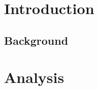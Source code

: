 \documentclass[11pt]{article}                             %
\newenvironment{colfigure}{                               %
  {\noindent\minipage{\linewidth}}                        %
  {\endminipage\par\bigskip}                              %
}
\newcommand{\colgraphic}[2]{%
  \begin{colfigure}                                       %
    \centering                                            %
    \texttt{[image: \#1]}            %
    \captionof{figure}{#2}                                %
  \end{colfigure}
}
\begin{document}

\medskip                                                  %
\noindent\makebox[\linewidth]{                            %
  \rule{\textwidth}{0.2pt}
}

\begin{multicols}{2}                                      %
  \section{Introduction}                                  %

  \subsection{Background}                                 %
  \blindtext

  \section{Analysis}
  \blindtext

  \bigskip                                                %

  \noindent\blindtext                                     %

\end{multicols}                                           %
\end{document}
